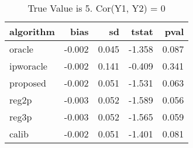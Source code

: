 \begin{table}[h!]

\caption{True Value is 5. Cor(Y1, Y2) = 0}
\centering
\begin{tabular}[t]{lrrrr}
\toprule
algorithm & bias & sd & tstat & pval\\
\midrule
oracle & -0.002 & 0.045 & -1.358 & 0.087\\
ipworacle & -0.002 & 0.141 & -0.409 & 0.341\\
proposed & -0.002 & 0.051 & -1.531 & 0.063\\
reg2p & -0.003 & 0.052 & -1.589 & 0.056\\
reg3p & -0.003 & 0.052 & -1.565 & 0.059\\
\addlinespace
calib & -0.002 & 0.051 & -1.401 & 0.081\\
\bottomrule
\end{tabular}
\end{table}
